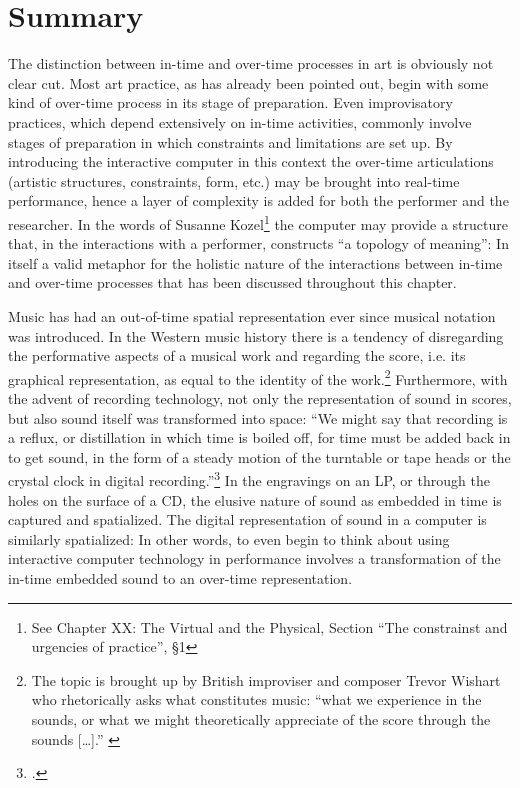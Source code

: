 \section{Summary}
\label{sec:summary}

The distinction between in-time and over-time processes in art is obviously not clear cut. Most art practice, as has already been pointed out, begin with some kind of over-time process in its stage of preparation. Even improvisatory practices, which depend extensively on in-time activities, commonly involve stages of preparation in which constraints and  limitations are set up. By introducing the interactive computer in this context the over-time articulations (artistic structures, constraints, form, etc.) may be brought into real-time performance, hence a layer of complexity is added for both the performer and the researcher. In the words of Susanne Kozel\footnote{See Chapter XX: The Virtual and the Physical, Section ``The constrainst and urgencies of practice'', \S1} the computer may provide a structure that, in the interactions with a performer, constructs ``a topology of meaning'': In itself a valid metaphor for the holistic nature of the interactions between in-time and over-time processes that has been discussed throughout this chapter.

Music has had an out-of-time spatial representation ever since musical notation was introduced. In the Western music history there is a tendency of disregarding the performative aspects of a musical work and regarding the score, i.e. its graphical representation, as equal to the identity of the work.\footnote{The topic is brought up by British improviser and composer Trevor Wishart who rhetorically asks what constitutes music: ``what we experience in the sounds, or what we might theoretically appreciate of the score through the sounds [\ldots].'' \cite{wis96}} Furthermore, with the advent of recording technology, not only the representation of sound in scores, but also sound itself was transformed into space: ``We might say that recording is a reflux, or distillation in which time is boiled off, for time must be added back in to get sound, in the form of a steady motion of the turntable or tape heads or the crystal clock in digital recording.''\footcite[54][]{evens05} In the engravings on an LP, or through the holes on the surface of a CD, the elusive nature of sound as embedded in time is captured and spatialized. The digital representation of sound in a computer is similarly spatialized: In other words, to even begin to think about using interactive computer technology in performance involves a transformation of the in-time embedded sound to an over-time representation.

